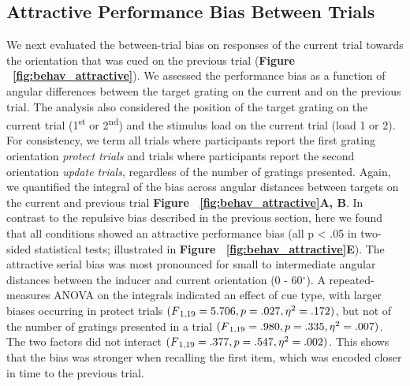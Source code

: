 \documentclass{article}
\begin{document}
\begin{large}
\subsection{Attractive Performance Bias Between Trials}
We next evaluated the between-trial bias on responses of the current trial towards the orientation that was cued on the previous trial (\textbf{Figure ~\ref{fig:behav_attractive}}). We assessed the performance bias as a function of angular differences between the target grating on the current and on the previous trial. The analysis also considered the position of the target grating on the current trial (1\textsuperscript{st} or 2\textsuperscript{nd}) and the stimulus load on the current trial (load 1 or 2). For consistency, we term all trials where participants report the first grating orientation \textit{protect trials} and trials where participants report the second orientation \textit{update trials}, regardless of the number of gratings presented. Again, we quantified the integral of the bias across angular distances between targets on the current and previous trial \textbf{Figure ~\ref{fig:behav_attractive}A, B}. In contrast to the repulsive bias described in the previous section, here we found that all conditions showed an attractive performance bias (all p < .05 in two-sided statistical tests; illustrated in \textbf{Figure ~\ref{fig:behav_attractive}E}). The attractive serial bias was most pronounced for small to intermediate angular distances between the inducer and current orientation (0 - 60$^{\circ}$). A repeated-measures ANOVA on the integrals indicated an effect of cue type, with larger biases occurring in protect trials $(F\textsubscript{1,19}  = 5.706, p = .027, \eta\textsuperscript{2} = .172)$, but not of the number of gratings presented in a trial $(F\textsubscript{1,19}  = .980, p = .335, \eta\textsuperscript{2} = .007)$. The two factors did not interact $(F\textsubscript{1,19}  = .377, p = .547, \eta\textsuperscript{2} = .002)$. This shows that the bias was stronger when recalling the first item, which was encoded closer in time to the previous trial.


\end{large}
\end{document}
